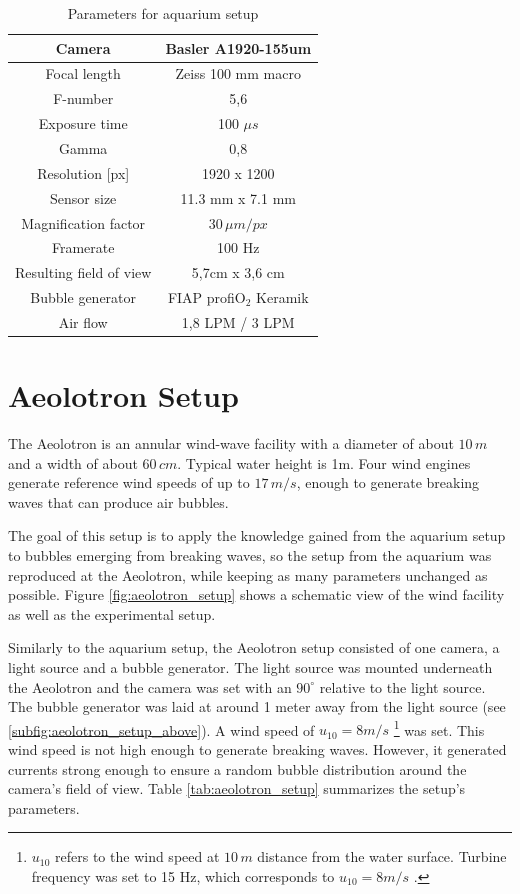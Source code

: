 		\begin{table}[h]
			\centering
		
			\begin{tabular}{|c|c|}
			\hline 
			Camera & Basler A1920-155um \\ 
			\hline 
			Focal length & Zeiss 100 mm macro \\ 
			\hline 
			F-number & 5,6 \\ 
			\hline 
			Exposure time & 100 $\mu s$ \\ 
			\hline 
			Gamma & 0,8 \\
			\hline
			Resolution [px] &1920 x 1200 \\
			\hline 
			Sensor size & 11.3 mm x 7.1 mm \\
			\hline 
			Magnification factor & $30 \, \mu m/px$ \\ 
			\hline 
			Framerate & 100 Hz \\ 
			\hline 
			Resulting field of view & 5,7cm x 3,6 cm \\
			\hline
			Bubble generator & FIAP profiO$_2$ Keramik\\			
			\hline
			Air flow & 1,8 LPM / 3 LPM \\ 
			\hline
			\end{tabular} 
			
			\caption{Parameters for aquarium setup}
			\label{tab:aquarium_param}

		\end{table}
		
	\section{Aeolotron Setup}\label{aeolotron_setup}
		The Aeolotron is an annular wind-wave facility with a diameter of about $10 \, m$ and a width of about $60 \, cm$. Typical water height is 1m. Four wind engines generate reference wind speeds of up to $17 \, m/s$, enough to generate breaking waves that can produce air bubbles. 
		
		The goal of this setup is to apply the knowledge gained from the aquarium setup to bubbles emerging from breaking waves, so the setup from the aquarium was reproduced at the Aeolotron, while keeping as many parameters unchanged as possible. Figure \ref{fig:aeolotron_setup} shows a schematic view of the wind facility as well as the experimental setup. 
		
		Similarly to the aquarium setup, the Aeolotron setup consisted of one camera, a light source and a bubble generator. 
		The light source was mounted underneath the Aeolotron and the camera was set with an $90^\circ$ relative to the light source. The bubble generator was laid at around 1 meter away from the light source (see \ref{subfig:aeolotron_setup_above}). A wind speed of $u_{10} = 8 m/s$ \footnote{$u_{10}$ refers to the wind speed at $10 \, m$ distance from the water surface. Turbine frequency was set to 15 Hz, which corresponds to $u_{10} = 8 m/s$ \citep{Bopp2018}.} was set. This wind speed is not high enough to generate breaking waves. However, it generated currents strong enough to ensure a random bubble distribution around the camera's field of view. Table \ref{tab:aeolotron_setup} summarizes the setup's parameters.
	
